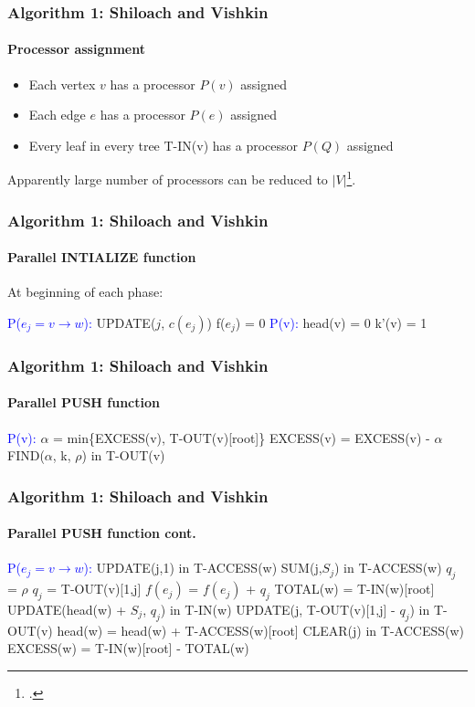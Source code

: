 \documentclass{beamer}
\begin{document}
\begin{frame}
\frametitle{Algorithm 1: Shiloach and Vishkin}
\framesubtitle{Processor assignment} 
\begin{itemize}
	\item Each vertex $v$ has a processor $P(v)$ assigned
	\item Each edge $e$ has a processor $P(e)$ assigned
	\item Every leaf in every tree T-IN(v) has a processor $P(Q)$ assigned
\end{itemize}
\pause
Apparently large number of processors can be reduced to $\lvert V \rvert$\footcite{yossi81}.
\end{frame}

\begin{frame}
\frametitle{Algorithm 1: Shiloach and Vishkin}
\framesubtitle{Parallel INTIALIZE function} 
At beginning of each phase:	
	\begin{algorithmic}[1]
		\State \textcolor{blue}{P($e_j = v \rightarrow w$):}
		\State UPDATE($j$, $c(e_j)$)
		\State f($e_j$) = 0
		\State \textcolor{blue}{P(v):}
		\State head(v) = 0	
		\State k'(v) = 1		
 	\EndFunction
	\end{algorithmic}
\end{frame}

\begin{frame}
\frametitle{Algorithm 1: Shiloach and Vishkin}
\framesubtitle{Parallel PUSH function} 
	\begin{algorithmic}[1]
		\State \textcolor{blue}{P(v):}
		\State $\alpha$ = min\{EXCESS(v), T-OUT(v)[root]\} 
		\State EXCESS(v) = EXCESS(v) - $\alpha$
		\State FIND($\alpha$, k, $\rho$) in T-OUT(v)
 	\EndFunction
	\end{algorithmic}
\end{frame}

\begin{frame}[shrink]
\frametitle{Algorithm 1: Shiloach and Vishkin}
\framesubtitle{Parallel PUSH function cont.} 
\begin{algorithmic}[1]
	\State \textcolor{blue}{P($e_j = v \rightarrow w$):}
 	\State UPDATE(j,1) in T-ACCESS(w)
	\State SUM(j,$S_j$) in T-ACCESS(w)
		$q_j$ = $\rho$
	\Else
		\State $q_j$ = T-OUT(v)[1,j]
	\EndIf
	\State $f(e_j)$ = $f(e_j)$ + $q_j$
	\State TOTAL(w) = T-IN(w)[root]
	\State UPDATE(head(w) + $S_j$, $q_j$) in T-IN(w)
	\State UPDATE(j, T-OUT(v)[1,j] - $q_j$) in T-OUT(v)
	\State head(w) = head(w) + T-ACCESS(w)[root] 
	\State CLEAR(j) in T-ACCESS(w)
	\State EXCESS(w) = T-IN(w)[root] - TOTAL(w)
	\EndIf
\end{algorithmic}
\end{frame}
\end{document}
